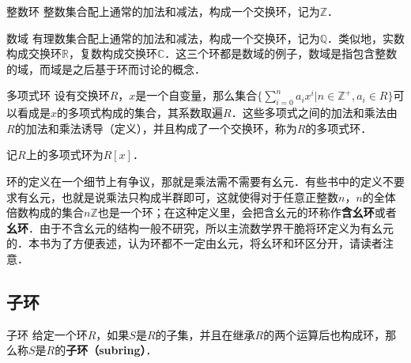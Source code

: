 \begin{example}{整数环}
整数集合配上通常的加法和减法，构成一个交换环，记为$\mathbb{Z}$．
\end{example}

\begin{example}{数域}
有理数集合配上通常的加法和减法，构成一个交换环，记为$\mathbb{Q}$．类似地，实数构成交换环$\mathbb{R}$，复数构成交换环$\mathbb{C}$．这三个环都是数域的例子，数域是指包含整数的域，而域是之后基于环而讨论的概念．
\end{example}

\begin{example}{多项式环}
设有交换环$R$，$x$是一个自变量，那么集合$\{\sum\limits_{i=0}^n a_ix^i|n\in\mathbb{Z}^+, a_i\in R\}$可以看成是$x$的多项式构成的集合，其系数取遍$R$．这些多项式之间的加法和乘法由$R$的加法和乘法诱导（定义），并且构成了一个交换环，称为$R$的多项式环．

记$R$上的多项式环为$R[x]$．
\end{example}

环的定义在一个细节上有争议，那就是乘法需不需要有幺元．有些书中的定义不要求有幺元，也就是说乘法只构成半群即可，这就使得对于任意正整数$n$，$n$的全体倍数构成的集合$n\mathbb{Z}$也是一个环；在这种定义里，会把含幺元的环称作\textbf{含幺环}或者\textbf{幺环}．由于不含幺元的结构一般不研究，所以主流数学界干脆将环定义为有幺元的．本书为了方便表述，认为环都不一定由幺元，将幺环和环区分开，请读者注意．

\subsection{子环}

\begin{definition}{子环}
给定一个环$R$，如果$S$是$R$的子集，并且在继承$R$的两个运算后也构成环，那么称$S$是$R$的\textbf{子环（subring）}．
\end{definition}



